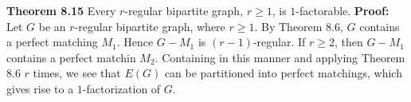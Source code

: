 \nopagenumbers
{\bf Theorem 8.15}
\vskip 6pt
Every $r$-regular bipartite graph, $r \geq 1$, is $1$-factorable.
\vskip 10pt
{\bf Proof:}
\vskip 6pt
Let $G$ be an $r$-regular bipartite graph, where $r \geq 1$. By Theorem 8.6, $G$ contains a perfect matching $M_1$. Hence $G-M_1$ is $(r-1)$-regular. If $r \geq 2$, then $G-M_1$ contains a perfect matchin $M_2$. Containing in this manner and applying Theorem 8.6 $r$ times, we see that $E(G)$ can be partitioned into perfect matchings, which gives rise to a $1$-factorization of $G$.


\vfill\eject
